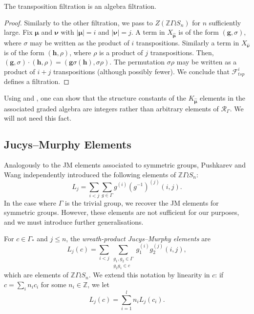 \documentclass[ALCO,Unicode]{cedram}
\newcommand{\bs}{\boldsymbol}
\newcommand{\RGamma}{\mathcal{R}_{\Gamma}}
\newcommand{\RGamma}{\mathcal{R}_{\Gamma}}
\begin{document}
\begin{proposition} \label{length_filtration_prop}
The transposition filtration is an algebra filtration. \end{proposition}

\begin{proof}
Similarly to the other filtration, we pass to $Z(\mathbb{Z}\Gamma \wr S_n)$ for $n$ sufficiently large. Fix $\bs \mu$ and $\bs \nu$ with $|\bs \mu| = i$ and $|\bs \nu| = j$. A term in $X_{\bm\hat{\bs \mu}}$ is of the form $(\mathbf{g}, \sigma)$, where $\sigma$ may be written as the product of $i$ transpositions. Similarly a term in $X_{\bm\hat{\bs \nu}}$ is of the form $(\mathbf{h}, \rho)$, where $\rho$ is a product of $j$ transpositions. Then, $(\mathbf{g}, \sigma) \cdot (\mathbf{h}, \rho) = (\mathbf{g}\sigma(\mathbf{h}), \sigma\rho)$. The permutation $\sigma \rho$ may be written as a product of $i+j$ transpositions (although possibly fewer). We conclude that $\mathcal{F}_{tsp}^i$ defines a filtration.
\end{proof}

\begin{remark}
Using \cite[Lemma 3.2]{FarahatHigman} and \cite[Proposition 2.9]{Wang1}, one can show that the structure constants of the $K_{\bm\hat{\bs\mu}}$ elements in the associated graded algebra are integers rather than arbitrary elements of $\RGamma$. We will not need this fact.
\end{remark}




\subsection{Jucys--Murphy Elements}
Analogously to the JM elements associated to symmetric groups, Pushkarev \cite{Pushkarev} and Wang \cite{Wang2} independently introduced the following elements of $\mathbb{Z} \Gamma \wr S_n$:
\[
L_j =
\sum_{i<j} \sum_{g \in \Gamma} g^{(i)} (g^{-1})^{(j)} (i, j).
\]
In the case where $\Gamma$ is the trivial group, we recover the JM elements for symmetric groups. However, these elements are not sufficient for our purposes, and we must introduce further generalisations.

\begin{definition}
For $c \in \Gamma_*$ and $j \leq n$, the \emph{wreath-product Jucys--Murphy elements} are
\[
L_j(c) = \sum_{i < j} \sum_{\substack{g_1, g_2 \in \Gamma \\ g_2g_1 \in c}} g_1^{(i)} g_2^{(j)} (i, j),
\]
which are elements of $\mathbb{Z} \Gamma \wr S_n$. We extend this notation by linearity in $c$: if $c = \sum_i  n_i c_i$ for some $n_i \in \mathbb{Z}$, we let
\[
L_j(c) = \sum_{i=1}^l n_i L_j(c_i).
\]
\end{definition}
\end{document}
